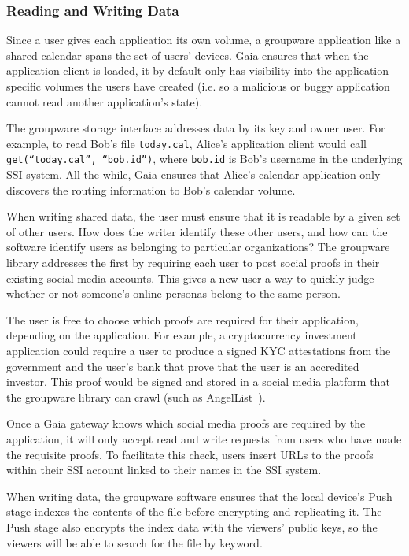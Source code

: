 \subsubsection{Reading and Writing Data}

Since a user gives each application its own volume, a groupware application like
a shared calendar spans the set of users' devices.  Gaia ensures that when the
application client is loaded, it by default only has visibility into the
application-specific volumes the users have created (i.e. so a malicious
or buggy application cannot read another application's state).

The groupware storage interface addresses data by its key and owner user.  For
example, to read Bob's file \texttt{today.cal}, Alice's application client would call
\texttt{get(``today.cal'', ``bob.id'')}, where \texttt{bob.id} is Bob's username
in the underlying SSI system.  All the while, Gaia
ensures that Alice's calendar application only discovers the routing information 
to Bob's calendar volume.

When writing shared data, the user must ensure that it is readable by a given
set of other users.  How does the writer identify these other users,
and how can the software identify users as belonging to particular
organizations?  The groupware library addresses the first by requiring each user to post
social proofs in their existing social media accounts.  This gives a new
user a way to quickly judge whether or not someone's online personas belong to
the same person.

The user is free to choose which proofs are required for their
application, depending on the application.  For example, a cryptocurrency
investment application could require a user to produce a signed KYC attestations
from the government and the user's bank that prove that the user is an
accredited investor.  This proof would be signed and stored in a social media
platform that the groupware library can crawl (such as
AngelList~\cite{angellist}).

Once a Gaia gateway knows which social media proofs are required by the
application, it will only accept read and write requests from users who have
made the requisite proofs.  To facilitate this check, users insert URLs to the
proofs within their SSI account linked to their names in the SSI system.

When writing data, the groupware software ensures that the local device's Push
stage indexes the contents of the file before encrypting and replicating it.
The Push stage also encrypts the index data with the viewers' public keys, so
the viewers will be able to search for the file by keyword.

